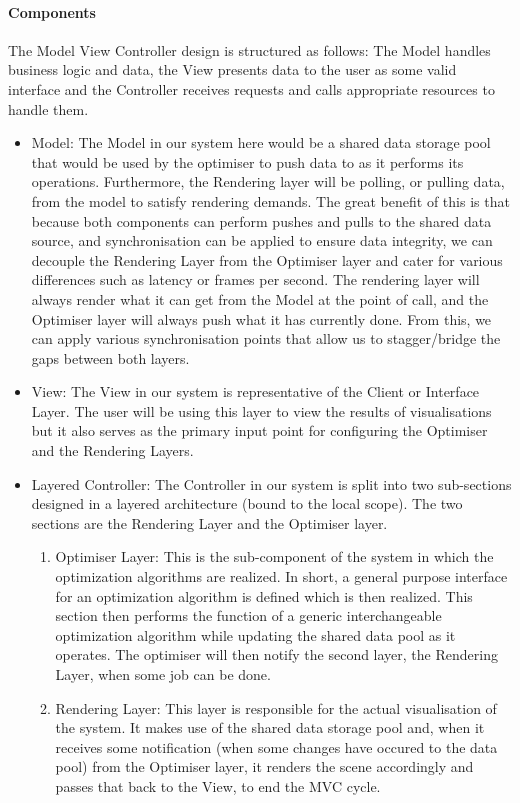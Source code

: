 \documentclass[11pt]{article}
\begin{document}
\paragraph{Components}
The Model View Controller design is structured as follows: The Model handles business logic and data, the View presents data to the user as some valid interface and the Controller receives requests and calls appropriate resources to handle them.
\begin{itemize}
\item Model: The Model in our system here would be a shared data storage pool that would be used by the optimiser to push data to as it performs its operations. Furthermore, the Rendering layer will be polling, or pulling data, from the model to satisfy rendering demands. The great benefit of this is that because both components can perform pushes and pulls to the shared data source, and synchronisation can be applied to ensure data integrity, we can decouple the Rendering Layer from the Optimiser layer and cater for various differences such as latency or frames per second. The rendering layer will always render what it can get from the Model at the point of call, and the Optimiser layer will always push what it has currently done. From this, we can apply various synchronisation points that allow us to stagger/bridge the gaps between both layers.

\item View: The View in our system is representative of the Client or Interface Layer. The user will be using this layer to view the results of visualisations but it also serves as the primary input point for configuring the Optimiser and the Rendering Layers.

\item Layered Controller: The Controller in our system is split into two sub-sections designed in a layered architecture (bound to the local scope). The two sections are the Rendering Layer and the Optimiser layer.
\begin{enumerate}
	\item Optimiser Layer: This is the sub-component of the system in which the optimization algorithms are realized. In short, a general purpose interface for an optimization algorithm is defined which is then realized. This section then performs the function of a generic interchangeable optimization algorithm while updating the shared data pool as it operates. The optimiser will then notify the second layer, the Rendering Layer, when some job can be done.
	\item Rendering Layer: This layer is responsible for the actual visualisation of the system. It makes use of the shared data storage pool and, when it receives some notification (when some changes have occured to the data pool) from the Optimiser layer, it renders the scene accordingly and passes that back to the View, to end the MVC cycle.
\end{enumerate}
\end{itemize}
\end{document}
